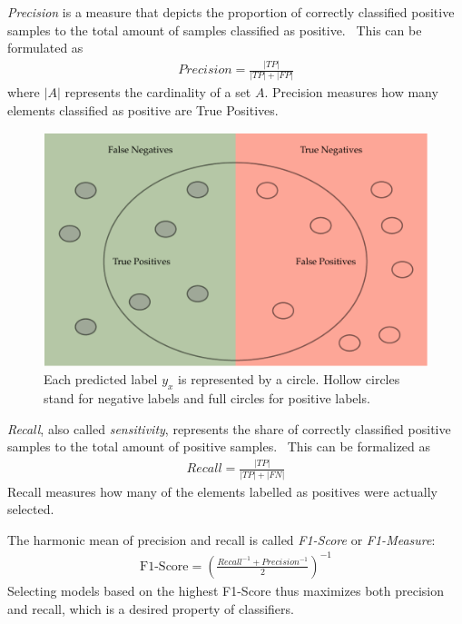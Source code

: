 \emph{Precision} is a measure that depicts the proportion of correctly classified positive samples to the total amount of samples classified as positive.~\cite[p.~4]{THA18} This can be formulated as
\begin{align}\label{eq:precision}
    Precision = \frac{|TP|}{|TP| + |FP|}
\end{align}
where \(|A|\) represents the cardinality of a set \(A\). Precision measures how many elements classified as positive are True Positives.

\begin{figure}[ht]
    \centering
    \includegraphics[width=\textwidth]{images/precision-and-recall}
    \caption{Each predicted label \(y_{x}\) is represented by a circle. Hollow circles stand for negative labels and full circles for positive labels.  }
    \label{fig:precision-and-recall}
\end{figure}

\emph{Recall}, also called \emph{sensitivity}, represents the
share of correctly classified positive samples to the total amount of positive samples.~\cite[p.~3]{THA18} This can be formalized as
\begin{align}\label{eq:recall}
    Recall = \frac{|TP|}{|TP| + |FN|}
\end{align}
Recall measures how many of the elements labelled as positives were actually selected.

The harmonic mean of precision and recall is called \emph{F1-Score} or \emph{F1-Measure}:
\begin{align}\label{eq:f1-score}
\text{F1-Score} = {\left(\frac{Recall^{-1} + Precision^{-1}}{2}\right)}^{-1}
\end{align}
Selecting models based on the highest F1-Score thus maximizes both precision and recall, which is a desired property of classifiers.

